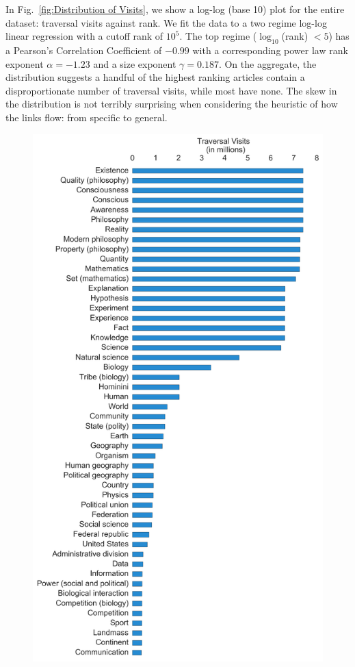 \documentclass[pre,twocolumn,twoside,superscriptaddress,floatfix, aps, 10pt]{revtex4-1}
\begin{document}
In Fig.~\ref{fig:Distribution of Visits}, we show a log-log (base 10) plot for the entire dataset: traversal visits against rank. 
We fit the data to a two regime log-log linear regression with a cutoff rank 
of $10^{5}$.
The top regime ($\log_{10}$(rank) $< 5$) has a Pearson's Correlation 
Coefficient of $-0.99$ with a corresponding power law rank exponent 
$\alpha = -1.23$ and a size exponent $\gamma = 0.187$.
On the aggregate, the distribution suggests
a handful of the highest ranking articles contain a disproportionate number of traversal visits, while most have none. The skew in the distribution is not terribly surprising when considering the heuristic of how the links flow: from specific to general. 


\begin{figure}[tp!]
  \includegraphics[width=\columnwidth]{graphics/articles_ranked.png}

\end{figure}
\end{document}
